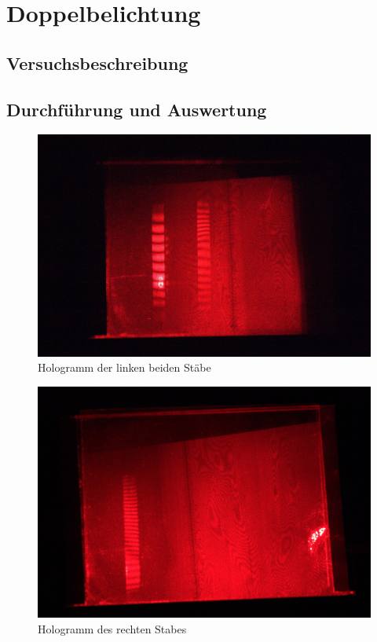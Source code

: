 \section{Doppelbelichtung}
\subsection{Versuchsbeschreibung}

\subsection{Durchführung und Auswertung}

\begin{figure}[ht]
 \includegraphics[width=\textwidth]{Photos/IMG_3909.jpg}
 \caption{Hologramm der linken beiden Stäbe}
\end{figure}


\begin{figure}[ht]
 \includegraphics[width=\textwidth]{Photos/IMG_3919.jpg}
 \caption{Hologramm des rechten Stabes}
\end{figure}


